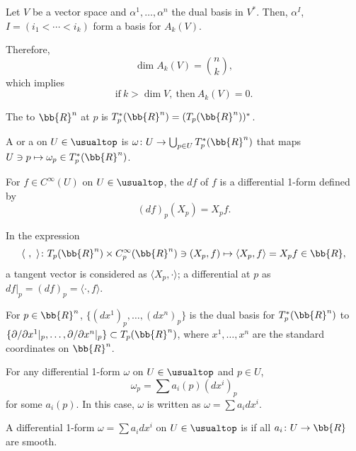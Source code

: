 Let $V$ be a vector space and $\alpha^1,\dotsc,\alpha^n$ the dual basis in $V^*$. Then, $\alpha^I$, $I = (i_1 < \dotsb < i_k)$ form a basis for $A_k(V)$.

Therefore,
\[
\dim A_k(V) = \binom{n}{k},
\]
which implies
\[
\text{if}\ k > \dim V,\ \text{then}\ A_k(V) = 0.
\]

The  to $\bb{R}^n$ at $p$ is $T^*_p (\bb{R}^n) = (T_p(\bb{R}^n))^*$.

A  or a  on $U \in \usualtop$ is $\omega \colon U \to \bigcup_{p \in U} T^*_p (\bb{R}^n)$ that maps $U \ni p \mapsto \omega_p \in T^*_p (\bb{R}^n)$.

For $f \in C^\infty (U)$ on $U \in \usualtop$, the  $df$ of $f$ is a differential 1-form defined by
\[
(df)_p (X_p) = X_p f.
\]


In the expression
\[
\langle \ ,\  \rangle \colon T_p(\bb{R}^n) \times C^\infty_p (\bb{R}^n) \ni (X_p, f) \mapsto \langle X_p, f \rangle = X_p f \in \bb{R},
\]
a tangent vector is considered as $\langle X_p, \cdot \rangle$; a differential at $p$ as $df|_p = (df)_p = \langle \cdot, f \rangle$.


For $p \in \bb{R}^n$, $\{ (dx^1)_p, \dotsc, (dx^n)_p \} $ is the dual basis for $T_p^* (\bb{R}^n)$ to $\{ \partial / \partial x^1|_p, \dotsc, \partial/\partial x^n|_p \} \subset T_p (\bb{R}^n)$, where $x^1, \dotsc, x^n$ are the standard coordinates on $\bb{R}^n$.

For any differential 1-form $\omega$ on $U \in \usualtop$ and $p \in U$,
\[
\omega_p = \sum a_i(p) (dx^i)_p
\]
for some $a_i (p)$. In this case, $\omega$ is written as $\omega = \sum a_i dx^i$.

A differential 1-form $\omega = \sum a_i dx^i$ on $U \in \usualtop$ is  if all $a_i \colon U \to \bb{R}$ are smooth.

